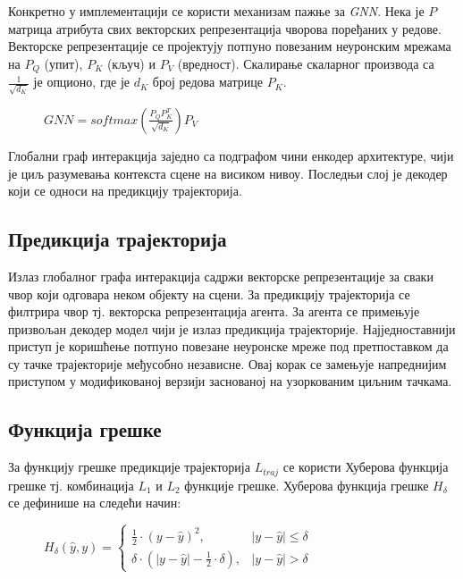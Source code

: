 \documentclass[11pt,oneside]{memoir}
\begin{document}
Конкретно у имплементацији се користи механизам пажње за \textit{GNN}.
Нека је $P$ матрица атрибута свих векторских репрезентација чворова поређаних у редове.
Векторске репрезентације се пројектују потпуно повезаним неуронским мрежама на $P_{Q}$ (упит), $P_{K}$ (кључ) и $P_{V}$ (вредност). 
Скалирање скаларног производа са $\frac{1}{\sqrt{d_{K}}}$ је опционо, где је $d_{K}$ број редова матрице $P_{K}$.

\begin{figure}[H]
  \centering
  $GNN = softmax(\frac{P_{Q}P^{T}_{K}}{\sqrt{d_{K}}})P_{V}$
\end{figure}

Глобални граф интеракција заједно са подграфом чини енкодер архитектуре,
чији је циљ разумевања контекста сцене на висиком нивоу. Последњи слој је декодер који се односи на предикцију трајекторија.

\subsection{Предикција трајекторија}

Излаз глобалног графа интеракција садржи векторске репрезентације за сваки чвор који одговара неком објекту на сцени.
За предикцију трајекторија се филтрира чвор тј. векторска репрезентација агента. За агента се примењује призвољан декодер модел
чији је излаз предикција трајекторије. Најједноставнији приступ је коришћење потпуно повезане неуронске мреже под претпоставком да су 
тачке трајекторије међусобно независне. Овај корак се замењује напреднијим приступом у модификованој верзији заснованој на узоркованим циљним тачкама.

\subsection{Функција грешке}

За функцију грешке предикције трајекторија $L_{traj}$ се користи Хуберова функција грешке тј. комбинација $L_1$ и $L_2$ функције грешке. Хуберова функција грешке $H_{\delta}$ се дефинише на следећи начин:

\begin{figure}[H]
  \centering
  $H_{\delta}(\hat{y}, y) = \begin{cases}
    \frac{1}{2}\cdot(y - \hat{y})^2, & |y - \hat{y}| \leq \delta \\
    \delta \cdot (|y - \hat{y}| - \frac{1}{2}\cdot \delta), & |y - \hat{y}| > \delta
  \end{cases}$
\end{figure}
\end{document}
